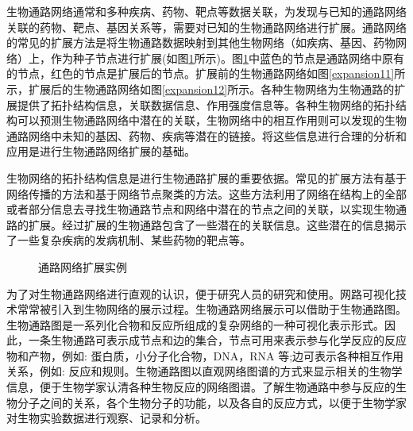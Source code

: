 生物通路网络通常和多种疾病、药物、靶点等数据关联，为发现与已知的通路网络关联的药物、靶点、基因关系等，需要对已知的生物通路网络进行扩展。通路网络的常见的扩展方法是将生物通路数据映射到其他生物网络（如疾病、基因、药物网络）上，作为种子节点进行扩展(如图\ref{fig1}所示)。图\ref{fig1}中蓝色的节点是通路网络中原有的节点，红色的节点是扩展后的节点。扩展前的生物通路网络如图\ref{expansion11}所示，扩展后的生物通路网络如图\ref{expansion12}所示。各种生物网络为生物通路的扩展提供了拓扑结构信息，关联数据信息、作用强度信息等。各种生物网络的拓扑结构可以预测生物通路网络中潜在的关联，生物网络中的相互作用则可以发现的生物通路网络中未知的基因、药物、疾病等潜在的链接。将这些信息进行合理的分析和应用是进行生物通路网络扩展的基础。

 生物网络的拓扑结构信息是进行生物通路扩展的重要依据。常见的扩展方法有基于网络传播的方法和基于网络节点聚类的方法。这些方法利用了网络在结构上的全部或者部分信息去寻找生物通路节点和网络中潜在的节点之间的关联，以实现生物通路的扩展。经过扩展的生物通路包含了一些潜在的关联信息。这些潜在的信息揭示了一些复杂疾病的发病机制、某些药物的靶点等。



\begin{figure}{\label{fig1}}
  \centering
  \begin{minipage}{.95\linewidth}
    \setlength{\subfigcapskip}{-1bp}
    \centering
    \begin{minipage}{\textwidth}
      \centering
      \subfigure{\label{expansion11}}\addtocounter{subfigure}{-2}
      \subfigure{\subfigure[扩展前的生物通路网络]{\texttt{[image: 1-a]}}}
      \subfigure{\label{expansion12}}\addtocounter{subfigure}{-2}
      \subfigure{\subfigure[扩展后的生物通路网络]{\texttt{[image: 1-b]}}}
    \end{minipage}
	\caption[fig1]{通路网络扩展实例}
  \end{minipage}
\end{figure}

为了对生物通路网络进行直观的认识，便于研究人员的研究和使用。网路可视化技术常常被引入到生物网络的展示过程。生物通路网络展示可以借助于生物通路图。生物通路图是一系列化合物和反应所组成的复杂网络的一种可视化表示形式。因此，一条生物通路可表示成节点和边的集合，节点可用来表示参与化学反应的反应物和产物，例如: 蛋白质，小分子化合物，DNA，RNA 等;边可表示各种相互作用关系，例如: 反应和规则。生物通路图以直观网络图谱的方式来显示相关的生物学信息，便于生物学家认清各种生物反应的网络图谱。了解生物通路中参与反应的生物分子之间的关系，各个生物分子的功能，以及各自的反应方式，以便于生物学家对生物实验数据进行观察、记录和分析。

